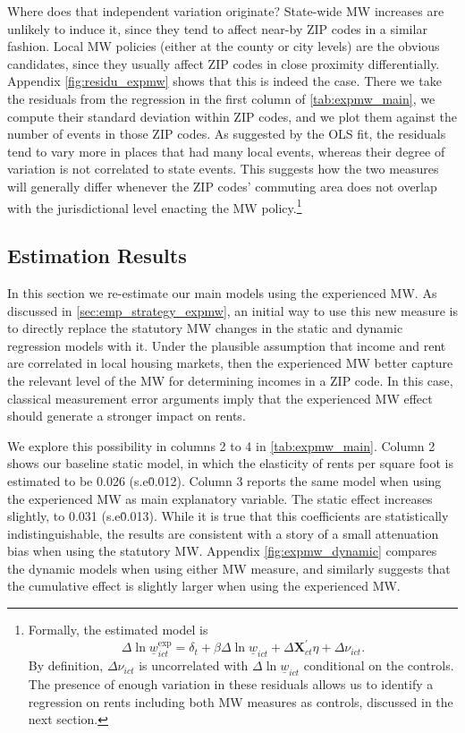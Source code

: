 Where does that independent variation originate? State-wide MW increases are unlikely to 
induce it, since they tend to affect near-by ZIP codes in a similar fashion. Local MW policies 
(either at the county or city levels) are the obvious candidates, since they usually affect 
ZIP codes in close proximity differentially. Appendix \autoref{fig:residu_expmw} shows that 
this is indeed the case. There we take the residuals from the regression in the first column 
of \autoref{tab:expmw_main}, we compute their standard deviation within ZIP codes, and we plot 
them against the number of events in those ZIP codes. As suggested by the OLS fit, the residuals
tend to vary more in places that had many local events, whereas their degree of variation is not 
correlated to state events. This suggests how the two measures will generally differ whenever the 
ZIP codes' commuting area does not overlap with the jurisdictional level enacting the MW 
policy.\footnote{Formally, the estimated model is 
	$$ \Delta \ln \underline{w}_{ict}^{\text{exp}} = \delta_t 
				+ \beta \Delta \ln \underline{w}_{ict} + \Delta \mathbf{X}^{'}_{ct} \eta 
				+ \Delta \nu_{ict} . $$
	By definition, $\Delta \nu_{ict}$ is uncorrelated with $\Delta \ln \underline{w}_{ict}$ 
	conditional on the controls. The presence of enough variation in these residuals allows us
	to identify a regression on rents including both MW measures as controls, discussed in the
	next section.}


\subsection{Estimation Results}

In this section we re-estimate our main models using the experienced MW. As discussed in 
\autoref{sec:emp_strategy_expmw}, an initial way to use this new measure is to directly
replace the statutory MW changes in the static and dynamic regression models with it. 
Under the plausible assumption that income and rent are correlated in local housing 
markets, then the experienced MW better capture the relevant level of the MW for 
determining incomes in a ZIP code. In this case, classical measurement error arguments 
imply that the experienced MW effect should generate a stronger impact on rents. 

We explore this possibility in columns 2 to 4 in \autoref{tab:expmw_main}. Column 2 
shows our baseline static model, in which the elasticity of rents per square foot is 
estimated to be 0.026 (s.e\. 0.012). Column 3 reports the same model when using the 
experienced MW as main explanatory variable. The static effect increases slightly, to 
0.031 (s.e\. 0.013). While it is true that this coefficients are statistically 
indistinguishable, the results are consistent with a story of a small attenuation bias 
when using the statutory MW. Appendix \autoref{fig:expmw_dynamic} compares the dynamic 
models when using either MW measure, and similarly suggests that the cumulative effect 
is slightly larger when using the experienced MW.

